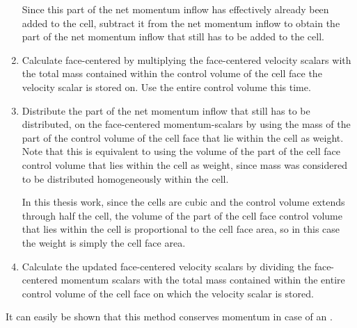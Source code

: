 \begin{enumerate}
    Since this part of the net momentum inflow has effectively already been added to the cell, subtract it from the net momentum inflow to obtain the part of the net momentum inflow that still has to be added to the cell.
    
    \item Calculate face-centered  by multiplying the face-cen\-tered velocity scalars with the total mass contained within the control volume of the cell face the velocity scalar is stored on. Use the entire control volume this time.
    
    \item Distribute the part of the net momentum inflow that still has to be distributed, on the face-centered momentum-scalars by using the mass of the part of the control volume of the cell face that lie within the cell as weight. Note that this is equivalent to using the volume of the part of the cell face control volume that lies within the cell as weight, since mass was considered to be distributed homogeneously within the cell.
    
    In this thesis work, since the cells are cubic and the control volume extends through half the cell, the volume of the part of the cell face control volume that lies within the cell is proportional to the cell face area, so in this case the weight is simply the cell face area.
    
    \item Calculate the updated face-centered velocity scalars by dividing the face-centered momentum scalars with the total mass contained within the entire control volume of the cell face on which the velocity scalar is stored.
\end{enumerate}

It can easily be shown that this method conserves momentum in case of an .